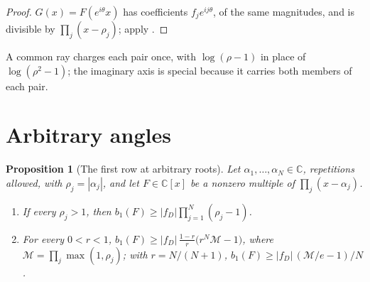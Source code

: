 \documentclass[11pt]{article}
\newtheorem{proposition}[theorem]{Proposition}
\begin{document}
\begin{proof}
$G(x)=F(e^{i\theta}x)$ has coefficients $f_je^{ij\theta}$, of the same
magnitudes, and is divisible by $\prod_j(x-\rho_j)$; apply
\cite[Corollary~3.3]{coefficient-mass}.
\end{proof}

A common ray charges each pair once, with $\log(\rho-1)$ in place of
$\log(\rho^2-1)$; the imaginary axis is special because it carries both
members of each pair.


\section{Arbitrary angles}\label{sec:angles}

\begin{proposition}[The first row at arbitrary roots]\label{prop:rowone}
Let $\alpha_1,\ldots,\alpha_N\in\mathbb C$, repetitions allowed, with
$\rho_j=|\alpha_j|$, and let $F\in\mathbb C[x]$ be a nonzero multiple of
$\prod_j(x-\alpha_j)$.
\begin{enumerate}
\item If every $\rho_j>1$, then $b_1(F)\ge|f_D|\prod_{j=1}^N(\rho_j-1)$.
\item For every $0<r<1$,
$b_1(F)\ge|f_D|\,\frac{1-r}{r}\bigl(r^N\mathcal M-1\bigr)$, where
$\mathcal M=\prod_j\max(1,\rho_j)$; with $r=N/(N+1)$,
$b_1(F)\ge|f_D|\,(\mathcal M/e-1)/N$.
\end{enumerate}
\end{proposition}
\end{document}

